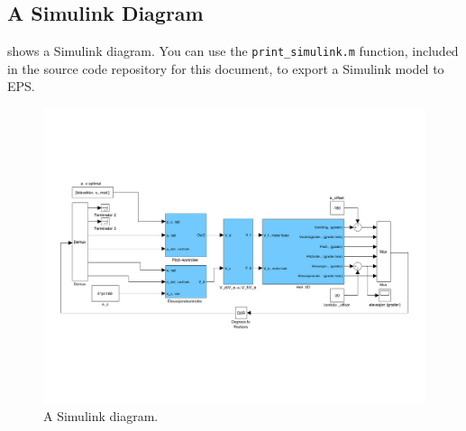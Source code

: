 \documentclass[11pt, a4paper, USenglish]{article} %
\begin{document}
\subsection{A Simulink Diagram}
 shows a Simulink diagram. You can use the \texttt{print\_simulink.m} function, included in the source code repository for this document, to export a Simulink model to EPS\@.
\begin{figure}[htb]
	\centering
		\includegraphics[width = \textwidth]{figures/simulink.pdf}
	\caption{A Simulink diagram.}
\label{fig:simulink}
\end{figure}
\end{document}
